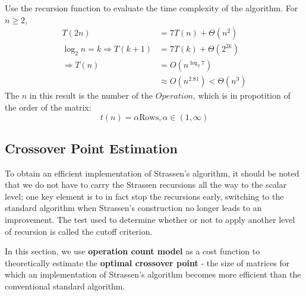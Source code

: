 \documentclass[UTF8]{ctexart}
\begin{document}
Use the recursion function to evaluate the time complexity of the algorithm.
For \(n\geqslant 2\),
\begin{equation}
  \begin{aligned}
    T(2n)                          & =7T(n)+\Theta(n^{2})              \\
    \log_{2} n=k\Rightarrow T(k+1) & =7T(k)+\Theta(2^{2k})             \\
    \Rightarrow T(n)               & =O(n^{\log_{2}7})                 \\
                                   & \approx O(n^{2.81})<\Theta(n^{3})
  \end{aligned}
\end{equation}
The \(n\) in this result is the number of the \(Operation\), which is in propotition of the order of the matrix:
\begin{equation}
  t(n)=\alpha \text{Rows},\alpha\in(1,\infty)
\end{equation}
\subsection{Crossover Point Estimation}
\label{CPE}

To obtain an efficient implementation of Strassen's algorithm, it should be noted that we do not have to carry the Strassen recursions all the way to the scalar level; one key element is to in fact stop the recursions early, switching to the standard algorithm when Strassen's construction no longer leads to an improvement. The test used to determine whether or not to apply another level of recursion is called the cutoff criterion.

In this section, we use \textbf{operation count model} as a cost function to theoretically estimate the \textbf{optimal crossover point} - the size of matrices for which an implementation of Strassen's algorithm becomes more efficient than the conventional standard algorithm.
\end{document}
